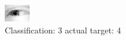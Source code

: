 \begin{figure}[h!]
\begin{center}
\includegraphics[width=0.60\columnwidth]{figures/ID2533_class_3_target_4.png}
\end{center}
\caption{ Classification: 3 actual target: 4}
\label{fig:ID2533_class_3_target_4}
\end{figure}
